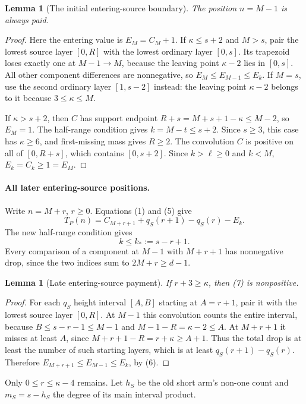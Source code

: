 \documentclass[11pt]{article}
\newtheorem{lemma}[proposition]{Lemma}
\begin{document}
\begin{lemma}[The initial entering-source boundary]
The position $n=M-1$ is always paid.
\end{lemma}
\begin{proof}
Here the entering value is $E_M=C_M+1$.
If $\kappa\le s+2$ and $M>s$, pair the lowest source layer $[0,R]$
with the lowest ordinary layer $[0,s]$. Its trapezoid loses exactly
one at $M-1\to M$, because the leaving point $\kappa-2$ lies in
$[0,s]$. All other component differences are nonnegative, so
$E_M\le E_{M-1}\le E_k$.
If $M=s$, use the second ordinary layer $[1,s-2]$ instead: the leaving
point $\kappa-2$ belongs to it because $3\le\kappa\le M$.

If $\kappa>s+2$, then $C$ has support endpoint
$R+s=M+s+1-\kappa\le M-2$, so $E_M=1$.
The half-range condition gives $k=M-t\le s+2$.
Since $s\ge3$, this case has $\kappa\ge6$, and first-missing mass
gives $R\ge2$. The convolution $C$ is positive on all of $[0,R+s]$,
which contains $[0,s+2]$. Since $k>\ell\ge0$ and $k<M$,
$E_k=C_k\ge1=E_M$.
\end{proof}

\paragraph{All later entering-source positions.}
Write $n=M+r$, $r\ge0$. Equations (1) and (5) give
\[
 T_P(n)=C_{M+r+1}+q_S(r+1)-q_S(r)-E_k.                 \tag{7}
\]
The new half-range condition gives
\[
                      k\le k_*:=s-r+1.                 \tag{8}
\]
Every comparison of a component at $M-1$ with $M+r+1$ has nonnegative
drop, since the two indices sum to $2M+r\ge d-1$.

\begin{lemma}[Late entering-source payment]
If $r+3\ge\kappa$, then (7) is nonpositive.
\end{lemma}
\begin{proof}
For each $q_S$ height interval $[A,B]$ starting at $A=r+1$, pair it
with the lowest source layer $[0,R]$. At $M-1$ this convolution counts
the entire interval, because $B\le s-r-1\le M-1$ and
$M-1-R=\kappa-2\le A$. At $M+r+1$ it misses at least $A$, since
$M+r+1-R=r+\kappa\ge A+1$.
Thus the total drop is at least the number of such starting layers,
which is at least $q_S(r+1)-q_S(r)$. Therefore
$E_{M+r+1}\le E_{M-1}\le E_k$, by (6).
\end{proof}

Only $0\le r\le\kappa-4$ remains. Let $h_S$ be the old short arm's
non-one count and $m_S=s-h_S$ the degree of its main interval product.
\end{document}
